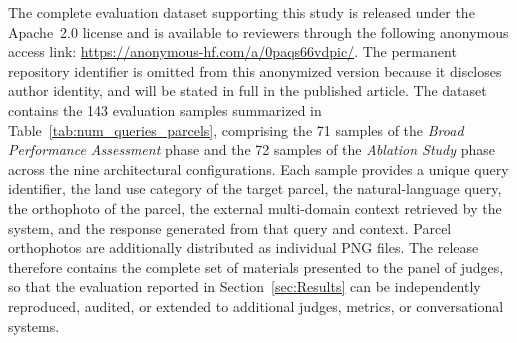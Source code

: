 \documentclass[preprint,review,12pt,authoryear]{elsarticle}
\begin{document}
The complete evaluation dataset supporting this study \citep{dataset_evaluation} is released under the Apache~2.0 license and is available to reviewers through the following anonymous access link: \url{https://anonymous-hf.com/a/0paqs66vdpic/}. The permanent repository identifier is omitted from this anonymized version because it discloses author identity, and will be stated in full in the published article. The dataset contains the 143 evaluation samples summarized in Table~\ref{tab:num_queries_parcels}, comprising the 71 samples of the \textit{Broad Performance Assessment} phase and the 72 samples of the \textit{Ablation Study} phase across the nine architectural configurations. Each sample provides a unique query identifier, the land use category of the target parcel, the natural-language query, the orthophoto of the parcel, the external multi-domain context retrieved by the system, and the response generated from that query and context. Parcel orthophotos are additionally distributed as individual PNG files. The release therefore contains the complete set of materials presented to the panel of judges, so that the evaluation reported in Section~\ref{sec:Results} can be independently reproduced, audited, or extended to additional judges, metrics, or conversational systems.

\begingroup
\def\baselinestretch{1}\normalsize


\endgroup






\end{document}
